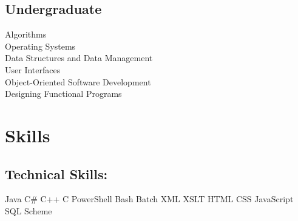 \documentclass[letterpaper]{kevin-resume} %
\begin{document}
\begin{minipage}[t]{0.30\textwidth}
\subsection{Undergraduate}

Algorithms \\
Operating Systems \\
Data Structures and Data Management \\
User Interfaces \\
Object-Oriented Software Development \\
Designing Functional Programs \\

\sectionspace %


\section{Skills}

\subsection{Technical Skills:}
Java \textbullet{}
C\# \textbullet{} 
C++ \textbullet{} 
C \textbullet{}
PowerShell
Bash \textbullet{} 
Batch \textbullet{} 
XML \textbullet{} 
XSLT \textbullet{} 
HTML
CSS \textbullet{} 
JavaScript \textbullet{} 
SQL \textbullet{} 
Scheme

\sectionspace %


\end{minipage} %
\hfill
%
%
\end{document}
